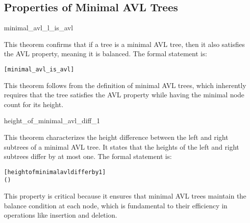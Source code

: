     \subsection{Properties of Minimal AVL Trees}
	
	\begin{thm}{minimal\_avl\_l\_is\_avl}

    This theorem confirms that if a tree is a minimal AVL tree, then it also satisfies the AVL property, meaning it is balanced. The formal statement is:

    \begin{alltt}
    	[minimal_avl_is_avl]
    	\HOLTokenTurnstile{}   \HOLSymConst{\HOLTokenImp{}}  
    \end{alltt}
    
    \end{thm}
    This theorem follows from the definition of minimal AVL trees, which inherently requires that the tree satisfies the AVL property while having the minimal node count for its height.


    \begin{thm}{height\_of\_minimal\_avl\_diff\_1}

    This theorem characterizes the height difference between the left and right subtrees of a minimal AVL tree. It states that the heights of the left and right subtrees differ by at most one. The formal statement is:
    
    \begin{alltt}
    	[height of minimal avl differ by 1]
    	\HOLTokenTurnstile{}  (     ) \HOLSymConst{\HOLTokenImp{}}
    \HOLSymConst{=}  \HOLSymConst{\HOLTokenConj{}}  \HOLSymConst{=}  \HOLSymConst{\HOLTokenDisj{}}   \HOLSymConst{=}   \HOLSymConst{\ensuremath{+}}  \HOLSymConst{\HOLTokenDisj{}}
     \HOLSymConst{=}   \HOLSymConst{\ensuremath{+}} 
    \end{alltt}
    
    
    \end{thm}
    This property is critical because it ensures that minimal AVL trees maintain the balance condition at each node, which is fundamental to their efficiency in operations like insertion and deletion.


